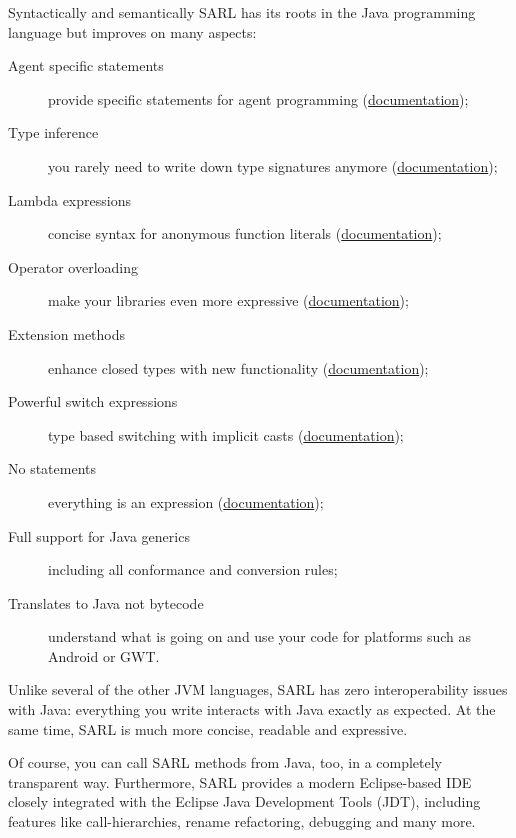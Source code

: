 \documentclass[article,english,nodocumentinfo]{utbmciadreport}
\begin{document}
Syntactically and semantically SARL has its roots in the Java programming language but improves on many aspects:
\begin{description}
\item[Agent specific statements] provide specific statements for agent programming (\href{http://www.sarl.io/docs/official/index.html\#5-2-agent-oriented-programming}{documentation});
\item[Type inference] you rarely need to write down type signatures anymore (\href{http://www.sarl.io/docs/official/reference/GeneralSyntax.html}{documentation});
\item[Lambda expressions] concise syntax for anonymous function literals (\href{http://www.sarl.io/docs/official/reference/general/Lambda.html}{documentation});
\item[Operator overloading] make your libraries even more expressive (\href{http://www.sarl.io/docs/official/reference/general/Operators.html}{documentation});
\item[Extension methods] enhance closed types with new functionality (\href{http://www.sarl.io/docs/official/reference/general/Extension.html}{documentation});
\item[Powerful switch expressions] type based switching with implicit casts (\href{http://www.sarl.io/docs/official/reference/general/SwitchExpression.html}{documentation});
\item[No statements] everything is an expression (\href{http://www.sarl.io/docs/official/reference/GeneralSyntax.html\#4-details-on-the-sarl-language-elements}{documentation});
\item[Full support for Java generics] including all conformance and conversion rules;
\item[Translates to Java not bytecode] understand what is going on and use your code for platforms such as Android or GWT.
\end{description}

Unlike several of the other JVM languages, SARL has zero interoperability issues with Java: everything you write interacts with Java exactly as expected.
At the same time, SARL is much more concise, readable and expressive.

Of course, you can call SARL methods from Java, too, in a completely transparent way.
Furthermore, SARL provides a modern Eclipse-based IDE closely integrated with the Eclipse Java Development Tools (JDT), including features like call-hierarchies, rename refactoring, debugging and many more.
\end{document}
